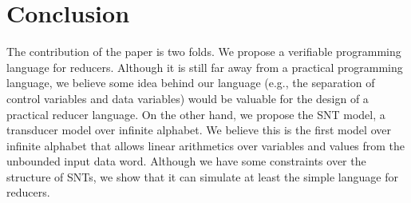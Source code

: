 	
\section{Conclusion}
\label{sec:conclusion}


The contribution of the paper is two folds. We propose a verifiable programming language for reducers. Although it is still far away from a practical programming language, we believe some idea behind our language (e.g., the separation of control variables and data variables) would be valuable for the design of a practical reducer language. On the other hand, we propose the SNT model, a transducer model over infinite alphabet. We believe this is the first model over infinite alphabet that allows linear arithmetics over variables and values from the unbounded input data word. Although we have some constraints over the structure of SNTs, we show that it can simulate at least the simple language for reducers. 



